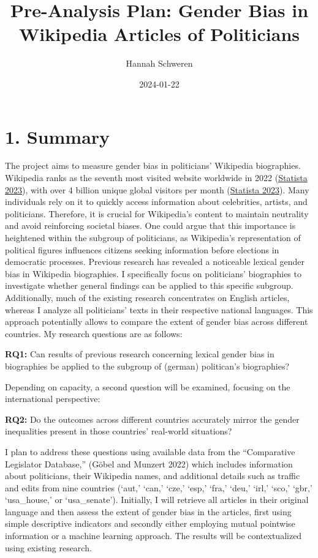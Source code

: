 \documentclass[
]{article}
\title{Pre-Analysis Plan: Gender Bias in Wikipedia Articles of
Politicians}
\author{Hannah Schweren}
\date{2024-01-22}
\begin{document}
\maketitle

{
\setcounter{tocdepth}{2}
\tableofcontents
}
\hypertarget{summary}{%
\section{1. Summary}\label{summary}}

The project aims to measure gender bias in politicians' Wikipedia
biographies. Wikipedia ranks as the seventh most visited website
worldwide in 2022
(\href{https://www.statista.com/statistics/1201880/most-visited-websites-worldwide/}{Statista
2023}), with over 4 billion unique global visitors per month
(\href{https://www.statista.com/statistics/1259907/wikipedia-website-traffic/}{Statista
2023}). Many individuals rely on it to quickly access information about
celebrities, artists, and politicians. Therefore, it is crucial for
Wikipedia's content to maintain neutrality and avoid reinforcing
societal biases. One could argue that this importance is heightened
within the subgroup of politicians, as Wikipedia's representation of
political figures influences citizens seeking information before
elections in democratic processes. Previous research has revealed a
noticeable lexical gender bias in Wikipedia biographies. I specifically
focus on politicians' biographies to investigate whether general
findings can be applied to this specific subgroup. Additionally, much of
the existing research concentrates on English articles, whereas I
analyze all politicians' texts in their respective national languages.
This approach potentially allows to compare the extent of gender bias
across different countries. My research questions are as follows:

\textbf{RQ1:} Can results of previous research concerning lexical gender
bias in biographies be applied to the subgroup of (german) politican's
biographies?

Depending on capacity, a second question will be examined, focusing on
the international perspective:

\textbf{RQ2:} Do the outcomes across different countries accurately
mirror the gender inequalities present in those countries' real-world
situations?

I plan to address these questions using available data from the
``Comparative Legislator Database,'' (Göbel and Munzert 2022) which
includes information about politicians, their Wikipedia names, and
additional details such as traffic and edits from nine countries (`aut,'
`can,' `cze,' `esp,' `fra,' `deu,' `irl,' `sco,' `gbr,' `usa\_house,' or
`usa\_senate'). Initially, I will retrieve all articles in their
original language and then assess the extent of gender bias in the
articles, first using simple descriptive indicators and secondly either
employing mutual pointwise information or a machine learning approach.
The results will be contextualized using existing research.
\end{document}
